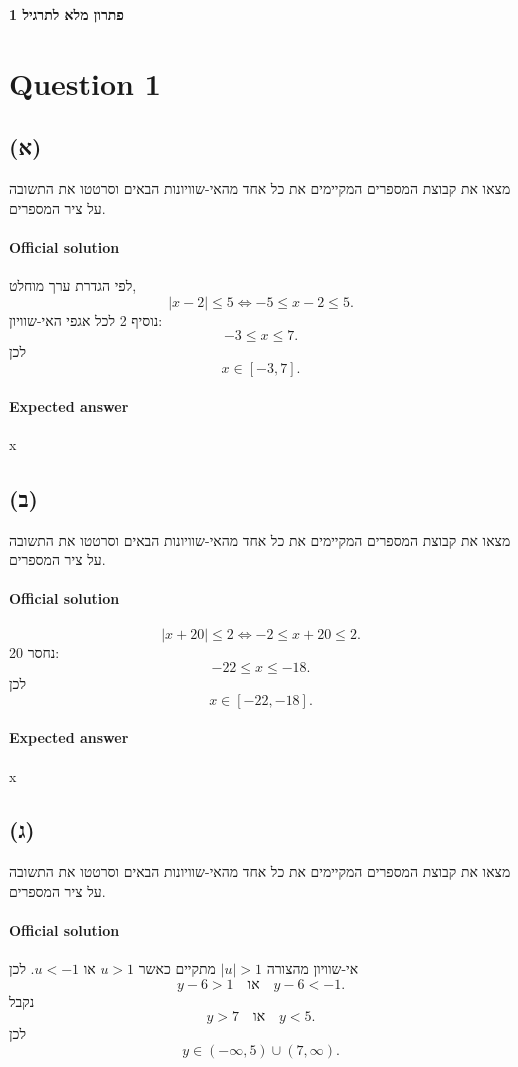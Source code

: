 \documentclass[12pt]{article}
\begin{document}

\textbf{פתרון מלא לתרגיל 1}


\section*{Question 1}

\subsection*{(א)}
מצאו את קבוצת המספרים המקיימים את כל אחד מהאי-שוויונות הבאים וסרטטו את התשובה על ציר המספרים.

\paragraph{Official solution}
לפי הגדרת ערך מוחלט,
\[
|x-2|\le 5 \iff -5\le x-2\le 5.
\]
נוסיף 2 לכל אגפי האי-שוויון:
\[
-3\le x\le 7.
\]
לכן
\[
\boxed{x\in[-3,7]}.
\]

\paragraph{Expected answer}
x\in[-3,7]


\subsection*{(ב)}
מצאו את קבוצת המספרים המקיימים את כל אחד מהאי-שוויונות הבאים וסרטטו את התשובה על ציר המספרים.

\paragraph{Official solution}
\[
|x+20|\le 2 \iff -2\le x+20\le 2.
\]
נחסר 20:
\[
-22\le x\le -18.
\]
לכן
\[
\boxed{x\in[-22,-18]}.
\]

\paragraph{Expected answer}
x\in[-22,-18]


\subsection*{(ג)}
מצאו את קבוצת המספרים המקיימים את כל אחד מהאי-שוויונות הבאים וסרטטו את התשובה על ציר המספרים.

\paragraph{Official solution}
אי-שוויון מהצורה \(|u|>1\) מתקיים כאשר \(u>1\) או \(u<-1\). לכן
\[
y-6>1 \quad \text{או} \quad y-6<-1.
\]
נקבל
\[
y>7 \quad \text{או} \quad y<5.
\]
לכן
\[
\boxed{y\in(-\infty,5)\cup(7,\infty)}.
\]
\end{document}

